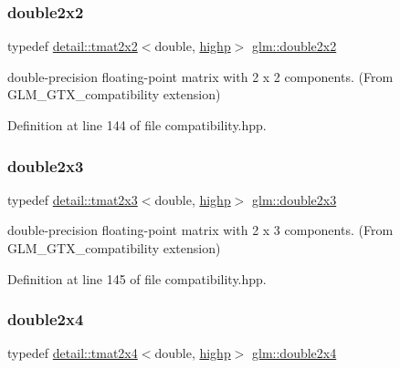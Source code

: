 \subsubsection{\texorpdfstring{double2x2}{double2x2}}
{\footnotesize\ttfamily typedef \hyperlink{structglm_1_1detail_1_1tmat2x2}{detail\+::tmat2x2}$<$double, \hyperlink{namespaceglm_a0f04f086094c747d227af4425893f545ac6f7eab42eacbb10d59a58e95e362074}{highp}$>$ \hyperlink{group__gtx__compatibility_ga75cfac00b48c51f4b677151f789b8547}{glm\+::double2x2}}



double-\/precision floating-\/point matrix with 2 x 2 components. (From G\+L\+M\+\_\+\+G\+T\+X\+\_\+compatibility extension) 



Definition at line 144 of file compatibility.\+hpp.

\mbox{\label{group__gtx__compatibility_gac267cd849a60e6e96350aa5fd665d5ef}} 
\subsubsection{\texorpdfstring{double2x3}{double2x3}}
{\footnotesize\ttfamily typedef \hyperlink{structglm_1_1detail_1_1tmat2x3}{detail\+::tmat2x3}$<$double, \hyperlink{namespaceglm_a0f04f086094c747d227af4425893f545ac6f7eab42eacbb10d59a58e95e362074}{highp}$>$ \hyperlink{group__gtx__compatibility_gac267cd849a60e6e96350aa5fd665d5ef}{glm\+::double2x3}}



double-\/precision floating-\/point matrix with 2 x 3 components. (From G\+L\+M\+\_\+\+G\+T\+X\+\_\+compatibility extension) 



Definition at line 145 of file compatibility.\+hpp.

\mbox{\label{group__gtx__compatibility_ga063ad3c07c7650955da6ec55819f11fe}} 
\subsubsection{\texorpdfstring{double2x4}{double2x4}}
{\footnotesize\ttfamily typedef \hyperlink{structglm_1_1detail_1_1tmat2x4}{detail\+::tmat2x4}$<$double, \hyperlink{namespaceglm_a0f04f086094c747d227af4425893f545ac6f7eab42eacbb10d59a58e95e362074}{highp}$>$ \hyperlink{group__gtx__compatibility_ga063ad3c07c7650955da6ec55819f11fe}{glm\+::double2x4}}



